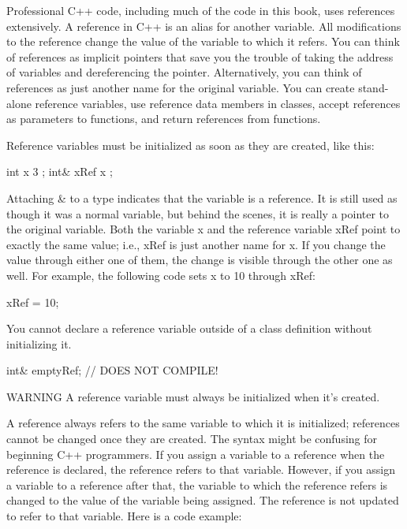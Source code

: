 
Professional C++ code, including much of the code in this book, uses references extensively. A reference in C++ is an alias for another variable. All modifications to the reference change the value of the variable to which it refers. You can think of references as implicit pointers that save you the trouble of taking the address of variables and dereferencing the pointer. Alternatively, you can think of references as just another name for the original variable. You can create stand-alone reference variables, use reference data members in classes, accept references as parameters to functions, and return references from functions.


Reference variables must be initialized as soon as they are created, like this:

\begin{cpp}
int x { 3 };
int& xRef { x };
\end{cpp}

Attaching \& to a type indicates that the variable is a reference. It is still used as though it was a normal variable, but behind the scenes, it is really a pointer to the original variable. Both the variable x and the reference variable xRef point to exactly the same value; i.e., xRef is just another name for x. If you change the value through either one of them, the change is visible through the other one as well. For example, the following code sets x to 10 through xRef:

\begin{cpp}
xRef = 10;
\end{cpp}

You cannot declare a reference variable outside of a class definition without initializing it.

\begin{cpp}
int& emptyRef; // DOES NOT COMPILE!
\end{cpp}

\begin{myWarning}{WARNING}
A reference variable must always be initialized when it’s created.
\end{myWarning}


A reference always refers to the same variable to which it is initialized; references cannot be changed once they are created. The syntax might be confusing for beginning C++ programmers. If you assign a variable to a reference when the reference is declared, the reference refers to that variable. However, if you assign a variable to a reference after that, the variable to which the reference refers is changed to the value of the variable being assigned. The reference is not updated to refer to that variable. Here is a code example:

